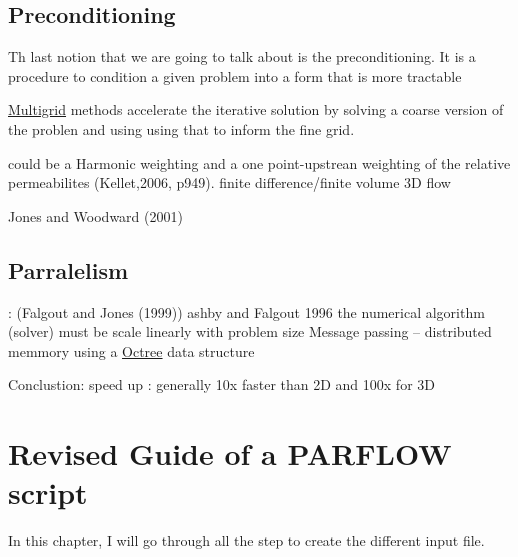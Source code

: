 \documentclass[11pt,a4paper]{report}
\begin{document}
\section{Preconditioning}
Th last notion  that we are going to talk about is the preconditioning. It is a procedure to condition a given problem into a form that is more tractable 


\href{https://en.wikipedia.org/wiki/Multigrid_method}{Multigrid} methods accelerate the iterative solution by solving a coarse version of the problen and using using that to inform the fine grid.

could be a
Harmonic weighting and a one point-upstrean weighting of the relative permeabilites (Kellet,2006, p949).
 finite difference/finite volume 3D flow


Jones and Woodward (2001)


\section{Parralelism}
: (Falgout and Jones (1999)) ashby and Falgout 1996
the numerical algorithm (solver) must be scale linearly with problem size
Message passing – distributed memmory
using a \href{http://en.wikipedia.org/wiki/Octree}{Octree}  data structure


Conclustion:
speed up : generally 10x faster than 2D and 100x for 3D























\chapter{Revised Guide of a PARFLOW script}

In this chapter, I will go through all the step to create the different input file. 
\end{document}
